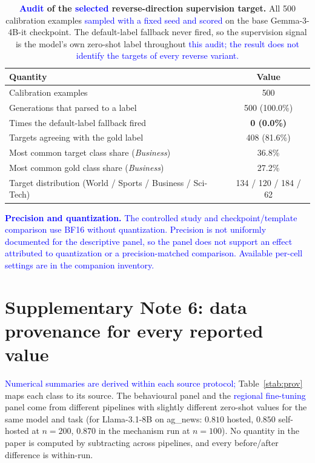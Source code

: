 \documentclass[11pt]{article}
\begin{document}
\begin{table}[h]
\centering
\caption{\textbf{\textcolor{blue}{Audit} of the \textcolor{blue}{selected} reverse-direction supervision target.} All 500 calibration examples
\textcolor{blue}{sampled with a fixed seed and scored} on the base Gemma-3-4B-it checkpoint. The
default-label fallback never fired, so the supervision signal is the model's own zero-shot
label throughout \textcolor{blue}{this audit; the result does not identify the targets of every reverse variant.}}
\label{stab:fallback}
\footnotesize
\begin{tabular}{lc}
\toprule
Quantity & Value \\
\midrule
Calibration examples                                   & 500 \\
Generations that parsed to a label                     & 500 (100.0\%) \\
Times the default-label fallback fired                 & \textbf{0 (0.0\%)} \\
Targets agreeing with the gold label                   & 408 (81.6\%) \\
Most common target class share (\emph{Business})       & 36.8\% \\
Most common gold class share (\emph{Business})          & 27.2\% \\
Target distribution (World / Sports / Business / Sci-Tech) & 134 / 120 / 184 / 62 \\
\bottomrule
\end{tabular}
\end{table}

\textbf{\textcolor{blue}{Precision and quantization.}} \textcolor{blue}{The controlled study and checkpoint/template
comparison use BF16 without quantization. Precision is not uniformly documented for the
descriptive panel, so the panel does not support an effect attributed to quantization or
a precision-matched comparison. Available per-cell settings are in the companion inventory.}

\section*{Supplementary Note 6: data provenance for every reported value}
\label{snote:prov}

\textcolor{blue}{Numerical summaries are derived within each source protocol;}
Table~\ref{stab:prov} maps each class to its source.
The behavioural panel and the \textcolor{blue}{regional fine-tuning} panel come from different pipelines with
slightly different zero-shot values for the same model and task (for Llama-3.1-8B on
ag\_news: $0.810$ hosted, $0.850$ self-hosted at $n{=}200$, $0.870$ in the mechanism run
at $n{=}100$). No quantity in the paper is computed by subtracting across pipelines, and
every before/after difference is within-run.
\end{document}
